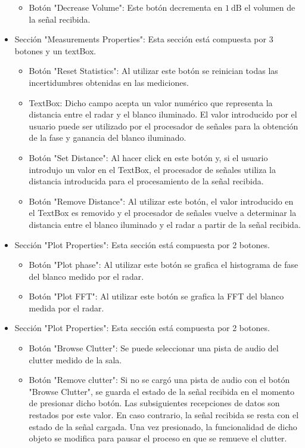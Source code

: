 \begin{itemize}
\begin{itemize}
    \item Botón "Decrease Volume": Este botón decrementa en $\SI{1}{\dB}$ el volumen de la señal recibida.
  \end{itemize}

  \item Sección "Measurements Properties": Esta sección está compuesta por 3 botones y un textBox.
  \begin{itemize}
    \item Botón "Reset Statistics": Al utilizar este botón se reinician todas las incertidumbres obtenidas en las mediciones.

    \item TextBox: Dicho campo acepta un valor numérico que representa la distancia entre el radar y el blanco iluminado. El valor introducido por el usuario puede ser utilizado por el procesador de señales para la obtención de la fase y ganancia del blanco iluminado.

    \item Botón "Set Distance": Al hacer click en este botón y, si el usuario introdujo un valor en el TextBox, el procesador de señales utiliza la distancia introducida para el procesamiento de la señal recibida.

    \item Botón "Remove Distance": Al utilizar este botón, el valor introducido en el TextBox es removido y el procesador de señales vuelve a determinar la distancia entre el blanco iluminado y el radar a partir de la señal recibida.
  \end{itemize}

  \item Sección "Plot Properties": Esta sección está compuesta por 2 botones.
  \begin{itemize}
    \item Botón "Plot phase": Al utilizar este botón se grafica el histograma de fase del blanco medido por el radar.

    \item Botón "Plot FFT": Al utilizar este botón se grafica la FFT del blanco medida por el radar.
  \end{itemize}

  \item Sección "Plot Properties": Esta sección está compuesta por 2 botones.
  \begin{itemize}
    \item Botón "Browse Clutter": Se puede seleccionar una pista de audio del clutter medido de la sala.

    \item Botón "Remove clutter": Si no se cargó una pista de audio con el botón "Browse Clutter", se guarda el estado de la señal recibida en el momento de presionar dicho botón. Las subsiguientes recepciones de datos son restados por este valor. En caso contrario, la señal recibida se resta con el estado de la señal cargada. Una vez presionado, la funcionalidad de dicho objeto se modifica para pausar el proceso en que se remueve el clutter.
  \end{itemize}
\end{itemize}


